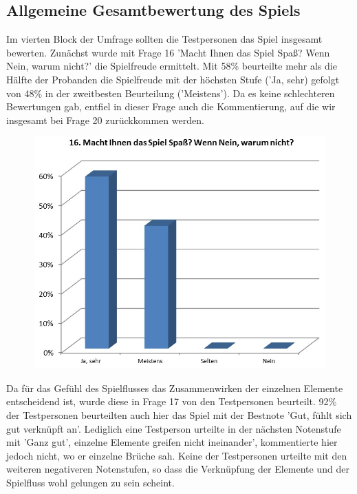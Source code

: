 \documentclass[extern,palatino]{cgBA}
\begin{document}
\subsection{Allgemeine Gesamtbewertung des Spiels}
Im vierten Block der Umfrage sollten die Testpersonen das Spiel insgesamt bewerten. Zunächst wurde mit Frage 16 'Macht Ihnen das Spiel Spaß? Wenn Nein, warum nicht?'  die Spielfreude ermittelt.  Mit 58\% beurteilte mehr als die Hälfte der Probanden die Spielfreude mit der höchsten Stufe ('Ja, sehr) gefolgt von 48\% in der zweitbesten Beurteilung ('Meistens'). Da es keine schlechteren Bewertungen gab, entfiel in dieser Frage auch die Kommentierung, auf die wir insgesamt bei Frage 20 zurückkommen werden. 
\begin{figure}[H]
	\centering
	\includegraphics[width=1\textwidth]{table13.jpg}
\end{figure}
Da für das Gefühl des Spielflusses das Zusammenwirken der einzelnen Elemente entscheidend ist, wurde diese in Frage 17 von den Testpersonen beurteilt. 92\% der Testpersonen beurteilten auch hier das Spiel mit der Bestnote 'Gut, fühlt sich gut verknüpft an'. Lediglich eine Testperson urteilte in der nächsten Notenstufe mit 'Ganz gut', einzelne Elemente  greifen nicht ineinander', kommentierte hier jedoch nicht, wo er einzelne Brüche sah. Keine der Testpersonen urteilte mit den weiteren negativeren Notenstufen, so dass die Verknüpfung der Elemente und der Spielfluss wohl gelungen zu sein scheint. 
\end{document}
